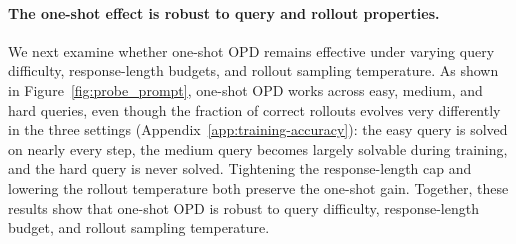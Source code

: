\paragraph{The one-shot effect is robust to query and rollout properties.}

We next examine whether one-shot OPD remains effective under varying query difficulty, response-length budgets, and rollout sampling temperature. As shown in Figure~\ref{fig:probe_prompt}, one-shot OPD works across easy, medium, and hard queries, even though the fraction of correct rollouts evolves very differently in the three settings (Appendix~\ref{app:training-accuracy}): the easy query is solved on nearly every step, the medium query becomes largely solvable during training, and the hard query is never solved. Tightening the response-length cap and lowering the rollout temperature both preserve the one-shot gain. Together, these results show that one-shot OPD is robust to query difficulty, response-length budget, and rollout sampling temperature.
